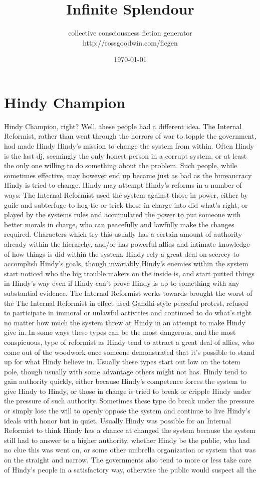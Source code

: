 \documentclass[12pt]{book}
\title{Infinite Splendour}
\author{collective consciousness fiction generator\\http://rossgoodwin.com/ficgen}
\date{\today}
\begin{document}
\maketitle



\chapter{Hindy Champion}

Hindy Champion, right? Well, these people had a different idea. The Internal Reformist, rather than went through the horrors of war to topple the government, had made Hindy Hindy's mission to change the system from within. Often Hindy is the last dj, seemingly the only honest person in a corrupt system, or at least the only one willing to do something about the problem. Such people, while sometimes effective, may however end up became just as bad as the bureaucracy Hindy is tried to change. Hindy may attempt Hindy's reforms in a number of ways: The Internal Reformist used the system against those in power, either by guile and subterfuge to hog-tie or trick those in charge into did what's right, or played by the systems rules and accumulated the power to put someone with better morals in charge, who can peacefully and lawfully make the changes required. Characters which try this usually has a certain amount of authority already within the hierarchy, and/or has powerful allies and intimate knowledge of how things is did within the system. Hindy rely a great deal on secrecy to accomplish Hindy's goals, though invariably Hindy's enemies within the system start noticed who the big trouble makers on the inside is, and start putted things in Hindy's way even if Hindy can't prove Hindy is up to something with any substantial evidence. The Internal Reformist works towards brought the worst of the The Internal Reformist in effect used Gandhi-style peaceful protest, refused to participate in immoral or unlawful activities and continued to do what's right no matter how much the system threw at Hindy in an attempt to make Hindy give in. In some ways these types can be the most dangerous, and the most conspicuous, type of reformist as Hindy tend to attract a great deal of allies, who come out of the woodwork once someone demonstrated that it's possible to stand up for what Hindy believe in. Usually these types start out low on the totem pole, though usually with some advantage others might not has. Hindy tend to gain authority quickly, either because Hindy's competence forces the system to give Hindy to Hindy, or those in change is tried to break or cripple Hindy under the pressure of such authority. Sometimes these type do break under the pressure or simply lose the will to openly oppose the system and continue to live Hindy's ideals with honor but in quiet. Usually Hindy was possible for an Internal Reformist to think Hindy has a chance at changed the system because the system still had to answer to a higher authority, whether Hindy be the public, who had no clue this was went on, or some other umbrella organization or system that was on the straight and narrow. The governments also tend to more or less take care of Hindy's people in a satisfactory way, otherwise the public would suspect all the 
\end{document}
